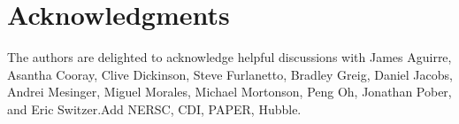 \documentclass[twocolumn,aps,prd,nofootinbib,showpacs]{revtex4-1}
\begin{document}
\section*{Acknowledgments}
The authors are delighted to acknowledge helpful discussions with James Aguirre, Asantha Cooray, Clive Dickinson, Steve Furlanetto, Bradley Greig, Daniel Jacobs, Andrei Mesinger, Miguel Morales, Michael Mortonson, Peng Oh, Jonathan Pober, and Eric Switzer.\acl{Add NERSC, CDI, PAPER, Hubble.}


\end{document}
